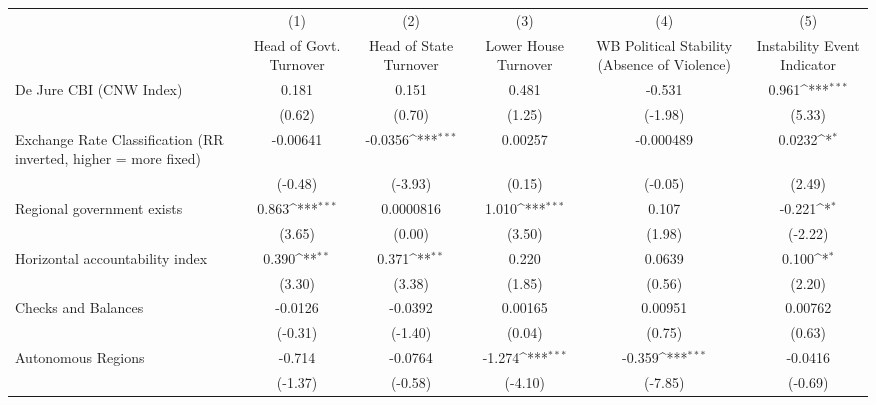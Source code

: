 {
\def\sym#1{\ifmmode^{#1}\else\(^{#1}\)\fi}
\begin{tabular*}{\linewidth}{@{\hskip\tabcolsep\extracolsep\fill}l*{5}{c}}
\toprule
                &\multicolumn{1}{c}{(1)}&\multicolumn{1}{c}{(2)}&\multicolumn{1}{c}{(3)}&\multicolumn{1}{c}{(4)}&\multicolumn{1}{c}{(5)}\\
                &\multicolumn{1}{c}{Head of Govt. Turnover}&\multicolumn{1}{c}{Head of State Turnover}&\multicolumn{1}{c}{Lower House Turnover}&\multicolumn{1}{c}{WB Political Stability (Absence of Violence)}&\multicolumn{1}{c}{Instability Event Indicator}\\
\midrule
De Jure CBI (CNW Index)&    0.181         &    0.151         &    0.481         &   -0.531         &    0.961\sym{***}\\
                &   (0.62)         &   (0.70)         &   (1.25)         &  (-1.98)         &   (5.33)         \\
\addlinespace
Exchange Rate Classification (RR inverted, higher = more fixed)& -0.00641         &  -0.0356\sym{***}&  0.00257         &-0.000489         &   0.0232\sym{*}  \\
                &  (-0.48)         &  (-3.93)         &   (0.15)         &  (-0.05)         &   (2.49)         \\
\addlinespace
Regional government exists   &    0.863\sym{***}&0.0000816         &    1.010\sym{***}&    0.107         &   -0.221\sym{*}  \\
                &   (3.65)         &   (0.00)         &   (3.50)         &   (1.98)         &  (-2.22)         \\
\addlinespace
Horizontal accountability index&    0.390\sym{**} &    0.371\sym{**} &    0.220         &   0.0639         &    0.100\sym{*}  \\
                &   (3.30)         &   (3.38)         &   (1.85)         &   (0.56)         &   (2.20)         \\
\addlinespace
Checks and Balances&  -0.0126         &  -0.0392         &  0.00165         &  0.00951         &  0.00762         \\
                &  (-0.31)         &  (-1.40)         &   (0.04)         &   (0.75)         &   (0.63)         \\
\addlinespace
Autonomous Regions&   -0.714         &  -0.0764         &   -1.274\sym{***}&   -0.359\sym{***}&  -0.0416         \\
                &  (-1.37)         &  (-0.58)         &  (-4.10)         &  (-7.85)         &  (-0.69)         \\

\end{tabular*}}
